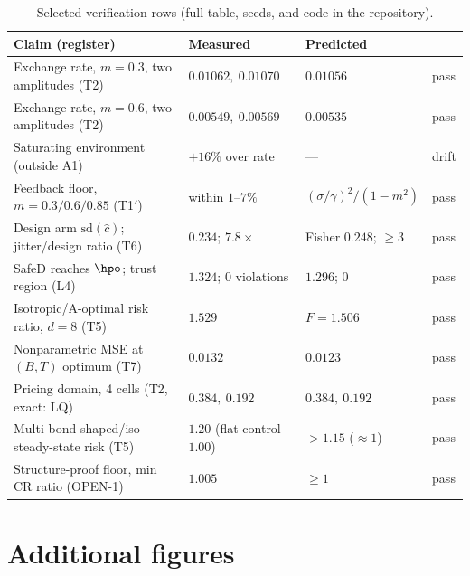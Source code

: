 \documentclass{article}
\begin{document}
\begin{table}[h]
\centering
\small
\caption{Selected verification rows (full table, seeds, and code in the repository).}
\label{tab:results}
\begin{tabular}{@{}llll@{}}
\toprule
Claim (register) & Measured & Predicted & \\
\midrule
Exchange rate, $m{=}0.3$, two amplitudes (T2) & $0.01062,\ 0.01070$ & $0.01056$ & pass \\
Exchange rate, $m{=}0.6$, two amplitudes (T2) & $0.00549,\ 0.00569$ & $0.00535$ & pass \\
Saturating environment (outside A1) & $+16\%$ over rate & --- & drift \\
Feedback floor, $m{=}0.3/0.6/0.85$ (T1$'$) & within $1$--$7\%$ & $(\sigma/\gamma)^2/(1{-}m^2)$ & pass \\
Design arm $\mathrm{sd}(\hat c)$; jitter/design ratio (T6) & $0.234$; $7.8\times$ & Fisher $0.248$; $\ge 3$ & pass \\
SafeD reaches $\hpo$; trust region (L4) & $1.324$; $0$ violations & $1.296$; $0$ & pass \\
Isotropic/A-optimal risk ratio, $d{=}8$ (T5) & $1.529$ & $F = 1.506$ & pass \\
Nonparametric MSE at $(B,T)$ optimum (T7) & $0.0132$ & $0.0123$ & pass \\
Pricing domain, 4 cells (T2, exact: LQ) & $0.384,\ 0.192$ & $0.384,\ 0.192$ & pass \\
Multi-bond shaped/iso steady-state risk (T5) & $1.20$ (flat control $1.00$) & $>1.15$ ($\approx 1$) & pass \\
Structure-proof floor, min CR ratio (OPEN-1) & $1.005$ & $\ge 1$ & pass \\
\bottomrule
\end{tabular}
\end{table}

\section{Additional figures}
\label{app:figures}
\end{document}
